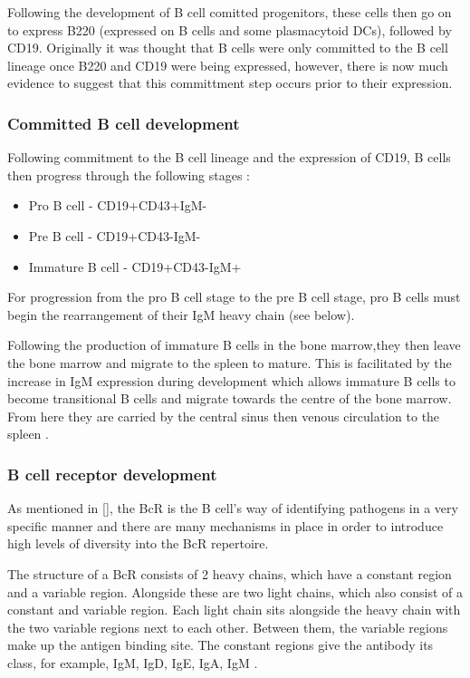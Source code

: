 Following the development of B cell comitted progenitors, these cells then go on to express B220 (expressed on B cells and some plasmacytoid DCs), followed by CD19.
Originally it was thought that B cells were only committed to the B cell lineage once B220 and CD19 were being expressed, however, there is now much evidence to suggest that this committment step occurs prior to their expression.


\subsubsection{Committed B cell development}
\label{subsubsec:committedBcelldevelopment}

Following commitment to the B cell lineage and the expression of CD19, B cells then progress through the following stages \citep{Cambier2007}:
\begin{itemize}
\item Pro B cell - CD19+CD43+IgM-
\item Pre B cell - CD19+CD43-IgM-
\item Immature B cell - CD19+CD43-IgM+
\end{itemize}

For progression from the pro B cell stage to the pre B cell stage, pro B cells must begin the rearrangement of their IgM heavy chain (see below).

Following the production of immature B cells in the bone marrow,they then leave the bone marrow and migrate to the spleen to mature.
This is facilitated by the increase in IgM expression during development which allows immature B cells to become transitional B cells and migrate towards the centre of the bone marrow. 
From here they are carried by the central sinus then venous circulation to the spleen \citep{Loder1999}.


\subsubsection{B cell receptor development}
\label{subsubsec:Bcellrecepdevelopment}

As mentioned in \cref{}, the BcR is the B cell's way of identifying pathogens in a very specific manner and there are many mechanisms in place in order to introduce high levels of diversity into the BcR repertoire.

The structure of a BcR consists of 2 heavy chains, which have a constant region and a variable region.
Alongside these are two light chains, which also consist of a constant and variable region.
Each light chain sits alongside the heavy chain with the two variable regions next to each other.
Between them, the variable regions make up the antigen binding site.
The constant regions give the antibody its class, for example, IgM, IgD, IgE, IgA, IgM \citep{Pieper2013}.


